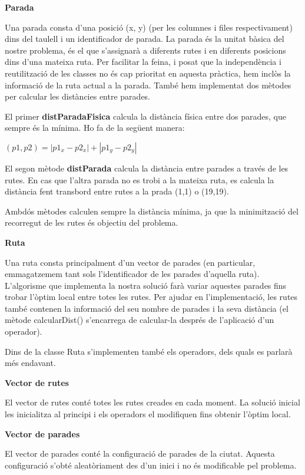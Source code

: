 \textbf{Parada}

Una parada consta d'una posició (x, y) (per les columnes i files respectivament) dins del taulell i un identificador de parada. La parada és la unitat bàsica del nostre problema, és el que s'assignarà a diferents rutes i en diferents posicions dins d'una mateixa ruta. Per facilitar la feina, i posat que la independència i reutilització de les classes no és cap prioritat en aquesta pràctica, hem inclòs la informació de la ruta actual a la parada. També hem implementat dos mètodes per calcular les distàncies entre parades. 

El primer \textbf{distParadaFisica} calcula la distància física entre dos parades, que sempre és la mínima. Ho fa de la següent manera:

\begin{center}
$(p1,p2)=|p1_{x} - p2_{x}|+|p1_{y} - p2_{y}|$ 
\end{center}

El segon mètode \textbf{distParada} calcula la distància entre parades a través de les rutes. En cas que l'altra parada no es trobi a la mateixa ruta, es calcula la distància fent transbord entre rutes a la prada (1,1) o (19,19).

Ambdós mètodes calculen sempre la distància mínima, ja que la minimització del recorregut de les rutes és objectiu del problema.

\textbf{Ruta}

Una ruta consta principalment d'un vector de parades (en particular, emmagatzemem tant sols l'identificador de les parades d'aquella ruta). L'algorisme que implementa la nostra solució farà variar aquestes parades fins trobar l'òptim local entre totes les rutes. Per ajudar en l'implementació, les rutes també contenen la informació del seu nombre de parades i la seva distància (el mètode calcularDist() s'encarrega de calcular-la després de l'aplicació d'un operador).

Dins de la classe Ruta s'implementen també els operadors, dels quals es parlarà més endavant.

\textbf{Vector de rutes}

El vector de rutes conté totes les rutes creades en cada moment. La solució inicial les inicialitza al principi i els operadors el modifiquen fins obtenir l'òptim local.

\textbf{Vector de parades}

El vector de parades conté la configuració de parades de la ciutat. Aquesta configuració s'obté aleatòriament des d'un inici i no és modificable pel problema.

